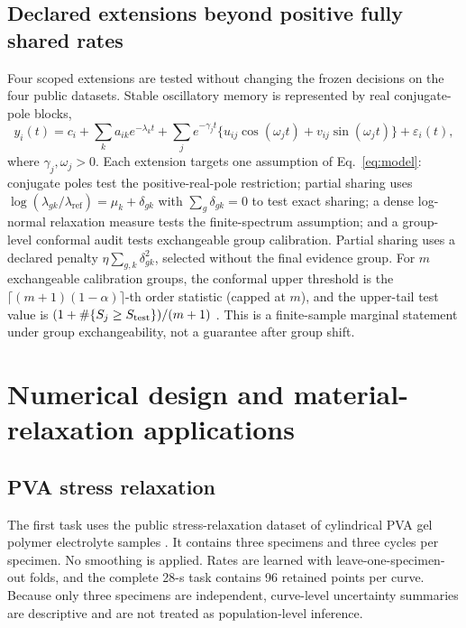 \documentclass[11pt]{article}
\begin{document}
\subsection{Declared extensions beyond positive fully shared rates}
Four scoped extensions are tested without changing the frozen decisions on the four public datasets. Stable oscillatory memory is represented by real conjugate-pole blocks,
\begin{equation}
y_i(t)=c_i+\sum_k a_{ik}e^{-\lambda_k t}+\sum_j e^{-\gamma_j t}\{u_{ij}\cos(\omega_jt)+v_{ij}\sin(\omega_jt)\}+\varepsilon_i(t),
\label{eq:oscillatory-extension}
\end{equation}
where $\gamma_j,\omega_j>0$. Each extension targets one assumption of Eq.~\eqref{eq:model}: conjugate poles test the positive-real-pole restriction; partial sharing uses $\log(\lambda_{gk}/\lambda_{\mathrm{ref}})=\mu_k+\delta_{gk}$ with $\sum_g\delta_{gk}=0$ to test exact sharing; a dense log-normal relaxation measure tests the finite-spectrum assumption; and a group-level conformal audit tests exchangeable group calibration. Partial sharing uses a declared penalty $\eta\sum_{g,k}\delta_{gk}^2$, selected without the final evidence group. For $m$ exchangeable calibration groups, the conformal upper threshold is the $\lceil(m+1)(1-\alpha)\rceil$-th order statistic (capped at $m$), and the upper-tail test value is $(1+\#\{S_j\ge S_{\rm test}\})/(m+1)$ \cite{shafer2008conformal}. This is a finite-sample marginal statement under group exchangeability, not a guarantee after group shift.
\section{Numerical design and material-relaxation applications}
\subsection{PVA stress relaxation}
The first task uses the public stress-relaxation dataset of cylindrical PVA gel polymer electrolyte samples \cite{schelkow2026pva}. It contains three specimens and three cycles per specimen. No smoothing is applied. Rates are learned with leave-one-specimen-out folds, and the complete 28-s task contains 96 retained points per curve. Because only three specimens are independent, curve-level uncertainty summaries are descriptive and are not treated as population-level inference.
\end{document}
